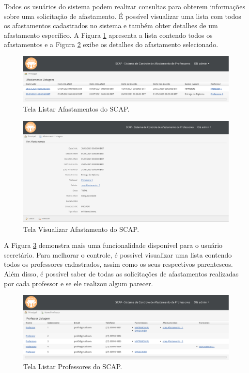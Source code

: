 Todos os usuários do sistema podem realizar consultas para obterem informações sobre uma solicitação de afastamento. É possível visualizar uma lista com todos os afastamentos cadastrados no sistema e também obter detalhes de um afastamento específico. A Figura \ref{fig-projeto-listar-afastamentos} apresenta a lista contendo todos os afastamentos e a Figura \ref{fig-projeto-ver-afastamento} exibe os detalhes do afastamento selecionado.  

\begin{figure}[h]
	\centering
	\includegraphics[scale=0.33]{figuras/fig-projeto-listar-afastamentos} 
	\caption{Tela Listar Afastamentos do SCAP.}
	\label{fig-projeto-listar-afastamentos}
\end{figure}

\begin{figure}[h]
	\centering
	\includegraphics[scale=0.33]{figuras/fig-projeto-ver-afastamento} 
	\caption{Tela Visualizar Afastamento do SCAP.}
	\label{fig-projeto-ver-afastamento}
\end{figure}

A Figura \ref{fig-projeto-listar-professores} demonstra mais uma funcionalidade disponível para o usuário secretário. Para melhorar o controle, é possível visualizar uma lista contendo todos os professores cadastrados, assim como os seus respectivos parentescos. Além disso, é possível saber de todas as solicitações de afastamentos realizadas por cada professor e se ele realizou algum parecer.  

\begin{figure}[h]
	\centering
	\includegraphics[scale=0.33]{figuras/fig-projeto-listar-professores} 
	\caption{Tela Listar Professores do SCAP.}
	\label{fig-projeto-listar-professores}
\end{figure}

